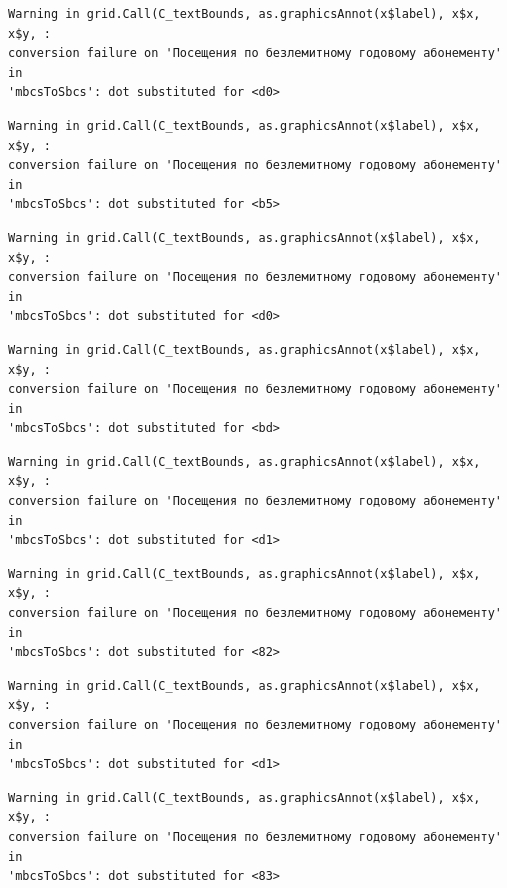 \documentclass[
  letterpaper,
  DIV=11,
  numbers=noendperiod]{scrartcl}
\begin{document}
\begin{verbatim}
Warning in grid.Call(C_textBounds, as.graphicsAnnot(x$label), x$x, x$y, :
conversion failure on 'Посещения по безлемитному годовому абонементу' in
'mbcsToSbcs': dot substituted for <d0>
\end{verbatim}

\begin{verbatim}
Warning in grid.Call(C_textBounds, as.graphicsAnnot(x$label), x$x, x$y, :
conversion failure on 'Посещения по безлемитному годовому абонементу' in
'mbcsToSbcs': dot substituted for <b5>
\end{verbatim}

\begin{verbatim}
Warning in grid.Call(C_textBounds, as.graphicsAnnot(x$label), x$x, x$y, :
conversion failure on 'Посещения по безлемитному годовому абонементу' in
'mbcsToSbcs': dot substituted for <d0>
\end{verbatim}

\begin{verbatim}
Warning in grid.Call(C_textBounds, as.graphicsAnnot(x$label), x$x, x$y, :
conversion failure on 'Посещения по безлемитному годовому абонементу' in
'mbcsToSbcs': dot substituted for <bd>
\end{verbatim}

\begin{verbatim}
Warning in grid.Call(C_textBounds, as.graphicsAnnot(x$label), x$x, x$y, :
conversion failure on 'Посещения по безлемитному годовому абонементу' in
'mbcsToSbcs': dot substituted for <d1>
\end{verbatim}

\begin{verbatim}
Warning in grid.Call(C_textBounds, as.graphicsAnnot(x$label), x$x, x$y, :
conversion failure on 'Посещения по безлемитному годовому абонементу' in
'mbcsToSbcs': dot substituted for <82>
\end{verbatim}

\begin{verbatim}
Warning in grid.Call(C_textBounds, as.graphicsAnnot(x$label), x$x, x$y, :
conversion failure on 'Посещения по безлемитному годовому абонементу' in
'mbcsToSbcs': dot substituted for <d1>
\end{verbatim}

\begin{verbatim}
Warning in grid.Call(C_textBounds, as.graphicsAnnot(x$label), x$x, x$y, :
conversion failure on 'Посещения по безлемитному годовому абонементу' in
'mbcsToSbcs': dot substituted for <83>
\end{verbatim}
\end{document}
